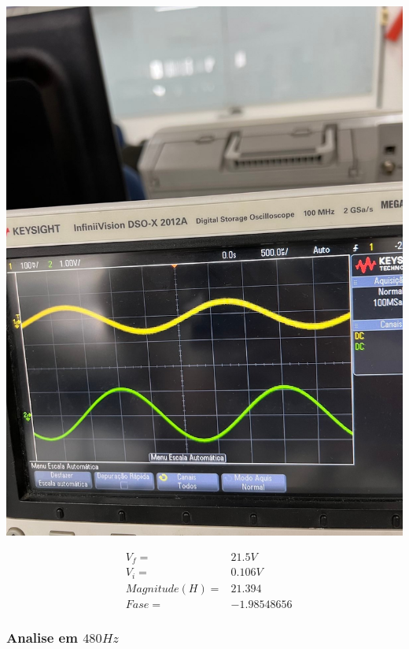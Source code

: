 \documentclass[12pt,twoside, a4paper, twocolumn]{article}
\begin{document}
\begin{adjustbox}{scale=0.18}
    \includegraphics{freq400.jpeg}
\end{adjustbox}

\begin{equation*}
    \begin{aligned}
         & V_f =          & 21.5V       \\
         & V_i =          & 0.106V      \\
         & Magnitude(H) = & 21.394      \\
         & Fase =         & -1.98548656
    \end{aligned}
\end{equation*}

\subsubsection{Analise em $480Hz$}
\subparagraph*{}
\end{document}
